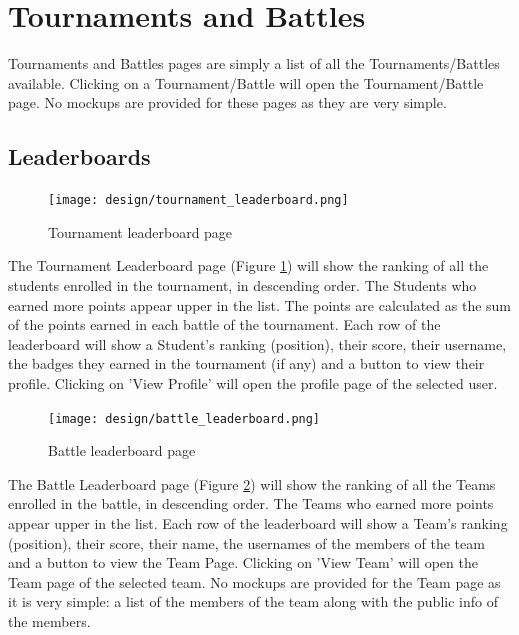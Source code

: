 \section{Tournaments and Battles}
\label{sec: tournaments_battles}%
Tournaments and Battles pages are simply a list of all the Tournaments/Battles available. 
Clicking on a Tournament/Battle will open the Tournament/Battle page. No mockups are provided for these pages as they are very simple.

\subsection{Leaderboards}
\label{subsec: leaderboards}%
\begin{figure} [H]
    \begin{center}
        \texttt{[image: design/tournament\_leaderboard.png]}
        \caption{Tournament leaderboard page}
        \label{fig: tournament_leaderboard}
    \end{center}
\end{figure}
The Tournament Leaderboard page (Figure \ref{fig: tournament_leaderboard}) will show the ranking of all the students enrolled in the tournament, in descending order.
The Students who earned more points appear upper in the list. 
The points are calculated as the sum of the points earned in each battle of the tournament.
Each row of the leaderboard will show a Student's ranking (position), their score, their username, the badges they earned in the tournament (if any) and a button to view their profile.
Clicking on 'View Profile' will open the profile page of the selected user.

\begin{figure} [H]
    \begin{center}
        \texttt{[image: design/battle\_leaderboard.png]}
        \caption{Battle leaderboard page}
        \label{fig: battle_leaderboard}
    \end{center}
\end{figure}
The Battle Leaderboard page (Figure \ref{fig: battle_leaderboard}) will show the ranking of all the Teams enrolled in the battle, in descending order.
The Teams who earned more points appear upper in the list.
Each row of the leaderboard will show a Team's ranking (position), their score, their name, the usernames of the members of the team and a button to view the Team Page.
Clicking on 'View Team' will open the Team page of the selected team.
No mockups are provided for the Team page as it is very simple: a list of the members of the team along with the public info of the members.


